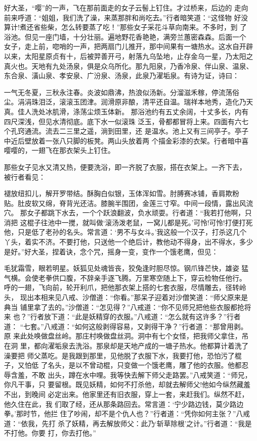 好大圣，“嘤”的一声，飞在那前面走的女子云髻上钉住。才过桥来，后边的
走向前来呼道：“姐姐，我们洗了澡，来蒸那胖和尚吃去。”行者暗笑道：“这怪物
好没算计!煮还省些柴，怎么转要蒸了吃！”那些女子采花斗草向南来。不多时，到
了浴池。但见一座门墙，十分壮丽。遍地野花香艳艳，满旁兰蕙密森森。后面一个
女子，走上前，唿哨的一声，把两扇门儿推开，那中间果有一塘热水。这水自开辟
以来，太阳星原贞有十，后被羿善开弓，射落九乌坠地，止存金乌一星，乃太阳之
真火也。天地有九处汤泉，俱是众乌所化。那九阳泉，乃香冷泉、伴山泉、温泉、
东合泉、潢山泉、孝安泉、广汾泉、汤泉，此泉乃濯垢泉。有诗为证，诗曰：

一气无冬夏，三秋永注春。炎波如鼎沸，热浪似汤新。分溜滋禾稼，停流荡俗
尘。涓涓珠泪泛，滚滚玉团津。润滑原非酿，清平还自温。瑞祥本地秀，造化乃天
真。佳人洗处冰肌滑，涤荡尘烦玉体新。
那浴池约有五丈余阔，十丈多长，内有四尺深浅，但见水清彻底。底下水一似滚珠
泛玉，骨都都冒将上来。四面有六七个孔窍通流。流去二三里之遥，淌到田里，还
是温水。池上又有三间亭子。亭子中近后壁放着一张八只脚的板凳。两山头放着两
个描金彩漆的衣架。行者暗中喜嘤嘤的，一翅飞在那衣架头上钉住。

那些女子见水又清又热，便要洗浴，即一齐脱了衣服，搭在衣架上。一齐下去，
被行者看见：

褪放纽扣儿，解开罗带结。酥胸白似银，玉体浑如雪。肘膊赛冰铺，香肩欺粉
贴。肚皮软又绵，脊背光还洁。膝腕半围团，金莲三寸窄。中间一段情，露出风流
穴。
那女子都跳下水去，一个个跃浪翻波，负水顽耍。行者道：“我若打他啊，只消把
这棍子往池中一搅，就叫做‘滚汤泼老鼠，一窝儿都是死。’可怜!可怜!打便打死
他，只是低了老孙的名头。常言道：‘男不与女斗。’我这般一个汉子，打杀这几个
丫头，着实不济。不要打他，只送他一个绝后计，教他动不得身，出不得水，多少
是好。”好大圣，捏着诀，念个咒，摇身一变，变作一个饿老鹰，但见：

毛犹霜雪，眼若明星。妖狐见处魂皆丧，狡兔逢时胆尽惊。钢爪锋芒快，雄姿
猛气横。会使老拳供口腹，不辞亲手逐飞腾。万里寒空随上下，穿云检物任他行。
呼的一翅，飞向前，轮开利爪，把他那衣架上搭的七套衣服，尽情雕去，径转岭头，
现出本相来见八戒、沙僧道：“你看。”那呆子迎着对沙僧笑道：“师父原来是典当
铺里拿了去的。”沙僧道：“怎见得？”八戒道：“你不见师兄把他些衣服都抢将来
也？”行者放下道：“此是妖精穿的衣服。”八戒道：“怎么就有这许多？”行者道：
“七套。”八戒道：“如何这般剥得容易，又剥得干净？”行者道：“那曾用剥。原
来此处唤做盘丝岭。那庄村唤做盘丝洞。洞中有七个女怪，把我师父拿住，吊在洞
里，都向濯垢泉去洗浴。那泉却是天地产成的一塘子热水。他都算计着洗了澡要把
师父蒸吃。是我跟到那里，见他脱了衣服下水，我要打他，恐怕污了棍子，又怕低
了名头，是以不曾动棍，只变做一个饿老鹰，雕了他的衣服。他都忍辱含羞，不敢
出头，蹲在水中哩。我等快去解下师父走路罢。”八戒笑道：“师兄，你凡干事，只
要留根。既见妖精，如何不打杀他，却就去解师父!他如今纵然藏羞不出，到晚间
必定出来。他家里还有旧衣服，穿上一套，来赶我们。纵然不赶，他久住在此，我
们取了经，还从那条路回去。常言道：‘宁少路边钱，莫少路边拳。’那时节，他拦
住了吵闹，却不是个仇人也？”行者道：“凭你如何主张？”八戒道：“依我，先打
杀了妖精，再去解放师父：此乃‘斩草除根’之计。”行者道：“我是不打他。你要
打，你去打他。”

